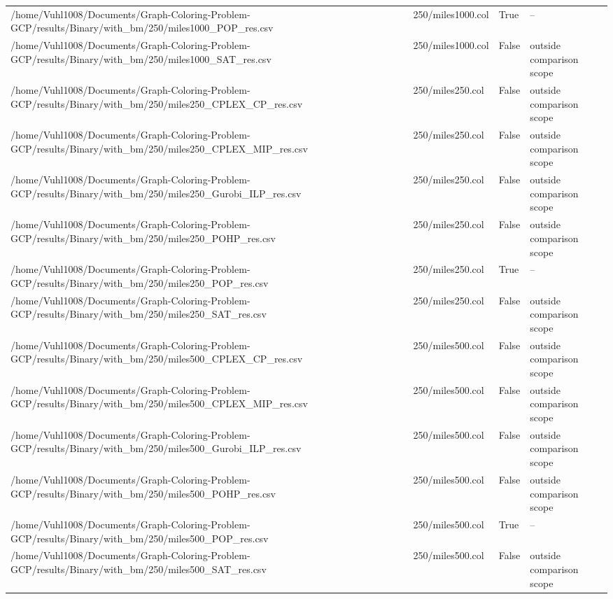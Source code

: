 \begin{table}[htbp]
\begin{tabular}{llll}
/home/Vuhl1008/Documents/Graph-Coloring-Problem-GCP/results/Binary/with\_bm/250/miles1000\_POP\_res.csv & 250/miles1000.col & True & -- \\
/home/Vuhl1008/Documents/Graph-Coloring-Problem-GCP/results/Binary/with\_bm/250/miles1000\_SAT\_res.csv & 250/miles1000.col & False & outside comparison scope \\
/home/Vuhl1008/Documents/Graph-Coloring-Problem-GCP/results/Binary/with\_bm/250/miles250\_CPLEX\_CP\_res.csv & 250/miles250.col & False & outside comparison scope \\
/home/Vuhl1008/Documents/Graph-Coloring-Problem-GCP/results/Binary/with\_bm/250/miles250\_CPLEX\_MIP\_res.csv & 250/miles250.col & False & outside comparison scope \\
/home/Vuhl1008/Documents/Graph-Coloring-Problem-GCP/results/Binary/with\_bm/250/miles250\_Gurobi\_ILP\_res.csv & 250/miles250.col & False & outside comparison scope \\
/home/Vuhl1008/Documents/Graph-Coloring-Problem-GCP/results/Binary/with\_bm/250/miles250\_POHP\_res.csv & 250/miles250.col & False & outside comparison scope \\
/home/Vuhl1008/Documents/Graph-Coloring-Problem-GCP/results/Binary/with\_bm/250/miles250\_POP\_res.csv & 250/miles250.col & True & -- \\
/home/Vuhl1008/Documents/Graph-Coloring-Problem-GCP/results/Binary/with\_bm/250/miles250\_SAT\_res.csv & 250/miles250.col & False & outside comparison scope \\
/home/Vuhl1008/Documents/Graph-Coloring-Problem-GCP/results/Binary/with\_bm/250/miles500\_CPLEX\_CP\_res.csv & 250/miles500.col & False & outside comparison scope \\
/home/Vuhl1008/Documents/Graph-Coloring-Problem-GCP/results/Binary/with\_bm/250/miles500\_CPLEX\_MIP\_res.csv & 250/miles500.col & False & outside comparison scope \\
/home/Vuhl1008/Documents/Graph-Coloring-Problem-GCP/results/Binary/with\_bm/250/miles500\_Gurobi\_ILP\_res.csv & 250/miles500.col & False & outside comparison scope \\
/home/Vuhl1008/Documents/Graph-Coloring-Problem-GCP/results/Binary/with\_bm/250/miles500\_POHP\_res.csv & 250/miles500.col & False & outside comparison scope \\
/home/Vuhl1008/Documents/Graph-Coloring-Problem-GCP/results/Binary/with\_bm/250/miles500\_POP\_res.csv & 250/miles500.col & True & -- \\
/home/Vuhl1008/Documents/Graph-Coloring-Problem-GCP/results/Binary/with\_bm/250/miles500\_SAT\_res.csv & 250/miles500.col & False & outside comparison scope \\

\end{tabular}
\end{table}

